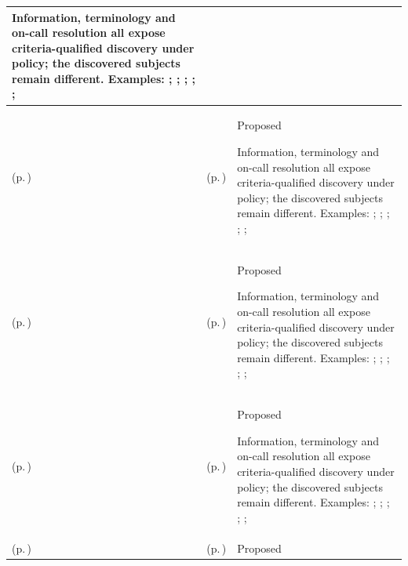 \begin{longtable}{|>{\raggedright\arraybackslash}p{0.27\TableWidth}|>{\raggedright\arraybackslash}p{0.27\TableWidth}|>{\raggedright\arraybackslash}p{0.46\TableWidth}|}
Information, terminology and on-call resolution all expose criteria-qualified discovery under policy; the discovered subjects remain different. Examples: \nameref{feature:feat-ise-08}; \nameref{feature:feat-ise-09}; \nameref{function:search-health-information}; \nameref{service:clinical-information-search-service}; \nameref{function:retrieve-health-information}; \nameref{service:clinical-resource-retrieval-service}\\\hline
\nameref{cap:bec-health-information-access} (p.\,\pageref{cap:bec-health-information-access}) & \nameref{cap:ec-06} (p.\,\pageref{cap:ec-06}) & Proposed

Information, terminology and on-call resolution all expose criteria-qualified discovery under policy; the discovered subjects remain different. Examples: \nameref{feature:feat-ise-08}; \nameref{feature:feat-ise-09}; \nameref{function:search-health-information}; \nameref{service:clinical-information-search-service}; \nameref{function:retrieve-health-information}; \nameref{service:clinical-resource-retrieval-service}\\\hline
\nameref{cap:bec-clinical-knowledge-services} (p.\,\pageref{cap:bec-clinical-knowledge-services}) & \nameref{cap:ec-05} (p.\,\pageref{cap:ec-05}) & Proposed

Information, terminology and on-call resolution all expose criteria-qualified discovery under policy; the discovered subjects remain different. Examples: \nameref{feature:feat-ise-14}; \nameref{feature:feat-ise-15}; \nameref{function:resolve-clinical-concept}; \nameref{service:terminology-concept-resolution-service}; \nameref{function:map-clinical-concept}; \nameref{service:terminology-mapping-service}\\\hline
\nameref{cap:bec-clinical-knowledge-services} (p.\,\pageref{cap:bec-clinical-knowledge-services}) & \nameref{cap:ec-06} (p.\,\pageref{cap:ec-06}) & Proposed

Information, terminology and on-call resolution all expose criteria-qualified discovery under policy; the discovered subjects remain different. Examples: \nameref{feature:feat-ise-14}; \nameref{feature:feat-ise-15}; \nameref{function:resolve-clinical-concept}; \nameref{service:terminology-concept-resolution-service}; \nameref{function:map-clinical-concept}; \nameref{service:terminology-mapping-service}\\\hline
\nameref{cap:bec-on-call-management} (p.\,\pageref{cap:bec-on-call-management}) & \nameref{cap:ec-05} (p.\,\pageref{cap:ec-05}) & Proposed


\end{longtable}
